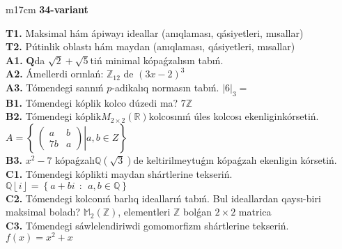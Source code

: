 \documentclass{article}
\begin{document}
\begin{tabular}{m{17cm}}
\textbf{34-variant}
\newline

\textbf{T1.} Maksimal hám ápiwayı ideallar (anıqlaması, qásiyetleri, mısallar) \\
\textbf{T2.} Pútinlik oblastı hám maydan (anıqlaması, qásiyetleri, mısallar) \\
\textbf{A1.} \(\mathbf{Q}\)da \(\sqrt{2} + \sqrt{5}\)tiń minimal kópaǵzalısın tabıń. \\
\textbf{A2.} Ámellerdi orınlań: \(\mathbb{Z}_{12}\) de \((3x - 2)^{3}\) \\
\textbf{A3.} Tómendegi sannıń \(p\)-adikalıq normasın tabıń. \(|6|_{3} =\) \\
\textbf{B1.} Tómendegi kóplik kolco dúzedi ma? \(7\mathbb{Z}\) \\
\textbf{B2.} Tómendegi kóplik\(M_{2 \times 2}\left( \mathbb{R} \right)\)kolcosınıń úles kolcosı ekenliginkórsetiń. \(A = \left\{ \left. \ \begin{pmatrix}
a & b \\
7b & a
\end{pmatrix} \right|a,b \in Z \right\}\) \\
\textbf{B3.} \(x^{2} - 7\) kópaǵzalı\(\mathbb{Q}(\sqrt{3})\)de keltirilmeytuǵın kópaǵzalı ekenligin kórsetiń. \\
\textbf{C1.} Tómendegi kóplikti maydan shártlerine tekseriń. \(\mathbb{Q}\left\lfloor i \right\rfloor = \left\{ a + bi\ \ :\ \ a,b\mathbb{\in Q} \right\}\) \\
\textbf{C2.} Tómendegi kolconıń barlıq ideallarıń tabıń. Bul ideallardan qaysı-biri maksimal boladı? \(\mathbb{M}_{2}\left( \mathbb{Z} \right)\), elementleri \(\mathbb{Z}\) bolǵan \(2 \times 2\) matrica \\
\textbf{C3.} Tómendegi sáwlelendiriwdi gomomorfizm shártlerine tekseriń. \(f(x) = x^{2} + x\) \\

\end{tabular}
\vspace{1cm}
\end{document}
